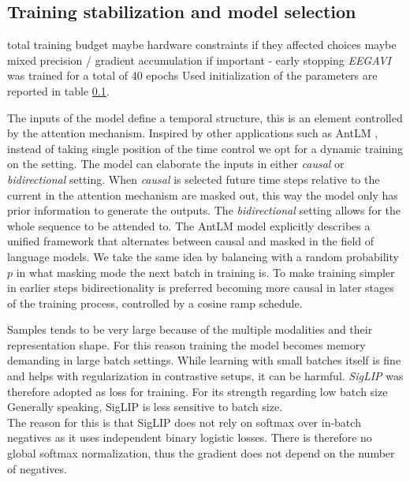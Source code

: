 \subsection{Training stabilization and model selection}
total training budget
maybe hardware constraints if they affected choices
maybe mixed precision / gradient accumulation if important
- early stopping
\textit{EEGAVI} was trained for a total of 40 epochs
Used initialization of the parameters are reported in table \ref{}.


The inputs of the model define a temporal structure, this is an element controlled by the attention mechanism.
Inspired by other applications such as AntLM \cite{yu2024antlmbridgingcausalmasked}, instead of taking single position of the time control we opt for a dynamic training on the setting.
The model can elaborate the inputs in either \textit{causal} or \textit{bidirectional} setting.
When \textit{causal} is selected future time steps relative to the current in the attention mechanism are masked out,
this way the model only has prior information to generate the outputs.
The \textit{bidirectional} setting allows for the whole sequence to be attended to.
The AntLM model explicitly describes a unified framework that alternates between causal and masked in the field of language models.
We take the same idea by balancing with a random probability $p$ in what masking mode the next batch in training is.
To make training simpler in earlier steps bidirectionality is preferred becoming more causal in later stages of the training process,
controlled by a cosine ramp schedule.




Samples tends to be very large because of the multiple modalities and their representation shape.
For this reason training the model becomes memory demanding in large batch settings.
While learning with small batches itself is fine and helps with regularization in contrastive setups, it can be harmful.
\textit{SigLIP}\cite{zhai2023sigmoidlosslanguageimage} was therefore adopted as loss for training.
For its strength regarding low batch size
Generally speaking, SigLIP is less sensitive to batch size.\\
The reason for this is that SigLIP does not rely on softmax over in-batch negatives as it uses independent binary logistic losses.
There is therefore no global softmax normalization, thus the gradient does not depend on the number of negatives.

